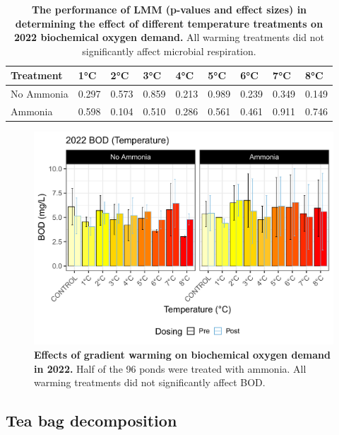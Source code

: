 \begin{table}[H]
    \caption{{\bf The performance of LMM (p-values and effect sizes) in determining the effect of different temperature treatments on 2022 biochemical oxygen demand.} All warming treatments did not significantly affect microbial respiration.}
    \centering
    \begin{tabular}{ m{2.5cm}<{\centering}m{1.2cm}<{\centering}m{1.2cm}<{\centering}m{1.2cm}<{\centering}m{1.2cm}<{\centering}m{1.2cm}<{\centering}m{1.2cm}<{\centering}m{1.2cm}<{\centering}m{1.2cm}<{\centering}} 
    \toprule
    Treatment & 1°C & 2°C & 3°C & 4°C & 5°C & 6°C & 7°C & 8°C \\
     \midrule
    No Ammonia & 0.297 & 0.573 & 0.859 & 0.213 & 0.989 & 0.239 & 0.349 & 0.149 \\
    Ammonia & 0.598 & 0.104 & 0.510 & 0.286 & 0.561 & 0.461 & 0.911 & 0.746 \\
    \bottomrule
    \end{tabular}    
    \label{tab:BOD_temp}
\end{table}

\begin{figure}[H]
    \centering
    \includegraphics[scale=0.5]{./Figures/BOD2022_bar_temp}
    \caption{\textbf{Effects of gradient warming on biochemical oxygen demand in 2022.} Half of the 96 ponds were treated with ammonia. All warming treatments did not significantly affect BOD.}
    \label{fig:BOD2022_temp}
\end{figure}

\subsection{Tea bag decomposition}\label{section:TDS}

